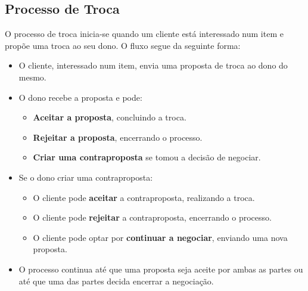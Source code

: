 \documentclass[a4paper, 12pt]{article} %
\begin{document}
\subsection{Processo de Troca}
O processo de troca inicia-se quando um cliente está interessado num item e propõe uma troca ao seu dono. O fluxo segue da seguinte forma:

\begin{itemize}

	\item O cliente, interessado num item, envia uma proposta de troca ao dono do mesmo.
	\item O dono recebe a proposta e pode:
	\begin{itemize}
		\item \textbf{Aceitar a proposta}, concluindo a troca.
		\item \textbf{Rejeitar a proposta}, encerrando o processo.
		\item \textbf{Criar uma contraproposta} se tomou a decisão de negociar.
	\end{itemize}
	\item Se o dono criar uma contraproposta:
	\begin{itemize}
		\item O cliente pode \textbf{aceitar} a contraproposta, realizando a troca.
		\item O cliente pode \textbf{rejeitar} a contraproposta, encerrando o processo.
		\item O cliente pode optar por \textbf{continuar a negociar}, enviando uma nova proposta.
	\end{itemize}
	\item O processo continua até que uma proposta seja aceite por ambas as partes ou até que uma das partes decida encerrar a negociação.
\end{itemize}
\end{document}
